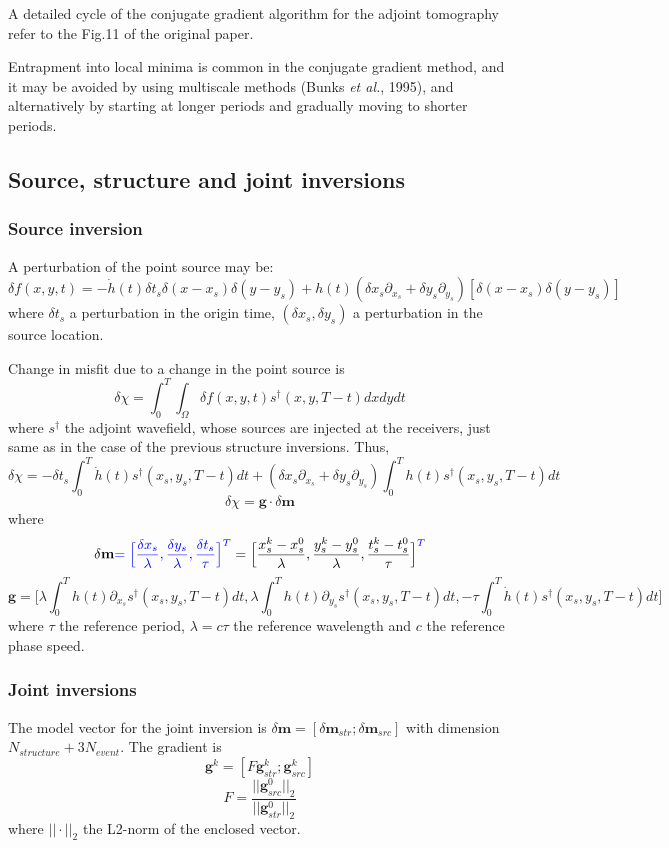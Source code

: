 \documentclass{article}
\newcommand{\mbf}[1]{\mathbf{#1}}
\newcommand{\myno}[1]{{\color{blue}#1}}
\newcommand{\etal}{\textit{et al.}}
\begin{document}
A detailed cycle of the conjugate gradient algorithm for the adjoint tomography refer to the Fig.11 of the original paper.\par
Entrapment into local minima is common in the conjugate gradient method, and it may be avoided by using multiscale methods (Bunks \etal, 1995), and alternatively by starting at longer periods and gradually moving to shorter periods.\par
\subsection{Source, structure and joint inversions}
\subsubsection{Source inversion}
A perturbation of the point source may be:
\[ \delta f(x,y,t)=-\dot h(t)\delta t_s\delta(x-x_s)\delta(y-y_s)+h(t)(\delta x_s\partial_{x_s}+\delta y_s\partial_{y_s})[\delta(x-x_s)\delta(y-y_s)] \]
where $\delta t_s$ a perturbation in the origin time, $(\delta x_s,\delta y_s)$ a perturbation in the source location.\par
Change in misfit due to a change in the point source is
\[ \delta\chi=\int_0^T\int_\Omega\delta f(x,y,t)s^\dagger(x,y,T-t)dxdydt \]
where $s^\dagger$ the adjoint wavefield, whose sources are injected at the receivers, just same as in the case of the previous structure inversions. Thus,
\[ \delta\chi=-\delta t_s\int_0^T\dot h(t)s^\dagger(x_s,y_s,T-t)dt+(\delta x_s\partial_{x_s}+\delta y_s\partial_{y_s})\int_0^Th(t)s^\dagger(x_s,y_s,T-t)dt \]
\[ \delta\chi=\mbf g\cdot\delta\mbf m \]
where
\[ \delta\mbf m\myno{=\Big[\frac{\delta x_s}{\lambda},\frac{\delta y_s}{\lambda},\frac{\delta t_s}{\tau}\Big]^T}=\Big[\frac{x_s^k-x_s^0}{\lambda},\frac{y_s^k-y_s^0}{\lambda},\frac{t_s^k-t_s^0}{\tau}\Big]^\myno{T} \]
\[ \mbf g=\Big[\lambda\int_0^Th(t)\partial_{x_s}s^\dagger(x_s,y_s,T-t)dt,\lambda\int_0^Th(t)\partial_{y_s}s^\dagger(x_s,y_s,T-t)dt,-\tau\int_0^T\dot h(t)s^\dagger(x_s,y_s,T-t)dt\Big] \]
where $\tau$ the reference period, $\lambda=c\tau$ the reference wavelength and $c$ the reference phase speed.\par
\subsubsection{Joint inversions}
The model vector for the joint inversion is $\delta\mbf m=[\delta\mbf m_{str};\delta\mbf m_{src}]$ with dimension $N_{structure}+3N_{event}$. The gradient is
\[ \mbf g^k=[F\mbf g_{str}^k;\mbf g_{src}^k] \]
\[ F=\frac{||\mbf g_{src}^0||_2}{||\mbf g_{str}^0||_2} \]
where $||\cdot||_2$ the L2-norm of the enclosed vector.\par
\end{document}
